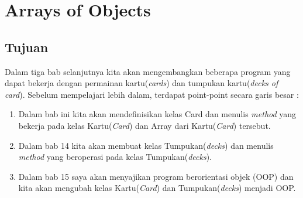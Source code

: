
%
\setcounter{chapter}{12}
\renewcommand{\chaptername}{Bab} 




%

\chapter{Arrays of Objects}
\section{Tujuan}

Dalam tiga bab selanjutnya kita akan mengembangkan beberapa program yang dapat bekerja dengan permainan kartu(\textit{cards}) dan tumpukan kartu(\textit{decks of card}). Sebelum mempelajari lebih dalam, terdapat point-point secara garis besar :
\begin{enumerate}
 \item Dalam bab ini kita akan mendefinisikan kelas Card dan menulis \textit{method} yang bekerja pada kelas Kartu(\textit{Card}) dan Array dari Kartu(\textit{Card}) tersebut.
  \item Dalam bab 14 kita akan membuat kelas Tumpukan(\textit{decks}) dan menulis \textit{method} yang beroperasi pada kelas Tumpukan(\textit{decks}).
  \item Dalam bab 15 saya akan menyajikan program berorientasi objek (OOP) dan kita akan mengubah kelas Kartu(\textit{Card}) dan Tumpukan(\textit{decks}) menjadi OOP.
\end{enumerate}

